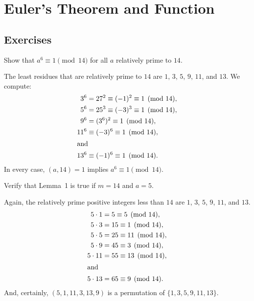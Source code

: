 \chapter{Euler's Theorem and Function}

\section{Exercises}

 Show that $a^6\equiv1\pmod{14}$ for all $a$ relatively
prime to $14$.
\begin{solution}
  The least residues that are relatively prime to $14$ are $1$, $3$,
  $5$, $9$, $11$, and $13$. We compute:
  \begin{align*}
    3^6 &= 27^2 \equiv (-1)^2 \equiv 1\pmod{14}, \\
    5^6 &= 25^3 \equiv (-3)^3 \equiv 1\pmod{14}, \\
    9^6 &= (3^6)^2 \equiv 1\pmod{14}, \\
    11^6 &\equiv (-3)^6 \equiv 1\pmod{14}, \\
    \intertext{and}
    13^6 &\equiv (-1)^6 \equiv 1\pmod{14}.
  \end{align*}
  In every case, $(a,14) = 1$ implies $a^6\equiv1\pmod{14}$.
\end{solution}

 Verify that Lemma~1 is true if $m = 14$ and $a = 5$.
\begin{solution}
  Again, the relatively prime positive integers less than $14$ are
  $1$, $3$, $5$, $9$, $11$, and $13$.
  \begin{align*}
    5\cdot1 &= 5 \equiv 5\pmod{14}, \\
    5\cdot3 &= 15 \equiv 1\pmod{14}, \\
    5\cdot5 &= 25 \equiv 11\pmod{14}, \\
    5\cdot9 &= 45 \equiv 3\pmod{14}, \\
    5\cdot11 &= 55 \equiv 13\pmod{14}, \\
    \intertext{and}
    5\cdot13 &= 65 \equiv 9\pmod{14}.
  \end{align*}
  And, certainly, $(5,1,11,3,13,9)$ is a permutation of
  $\{1,3,5,9,11,13\}$.
\end{solution}
